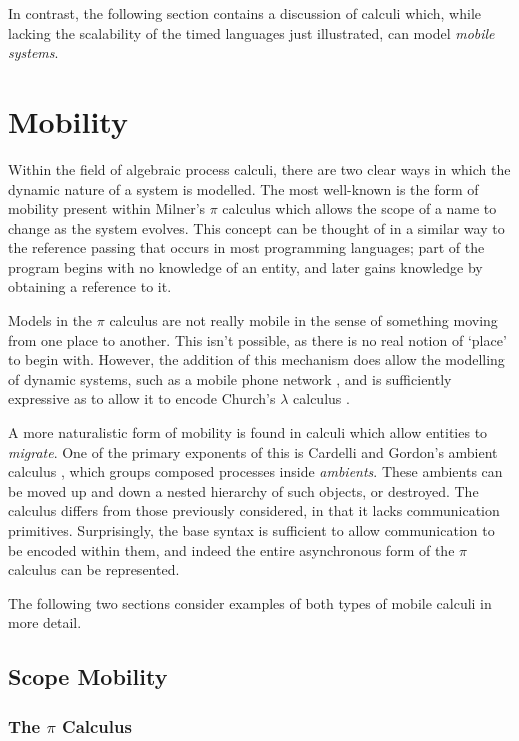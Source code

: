 In contrast, the following section contains a discussion of calculi
which, while lacking the scalability of the timed languages just
illustrated, can model \emph{mobile systems}.

\section{Mobility}
\label{mobility}

Within the field of algebraic process calculi, there are two clear ways
in which the dynamic nature of a system is modelled.  The most
well-known is the form of mobility present within Milner's $\pi$
calculus which allows the scope of a name to change as the system
evolves.  This concept can be thought of in a similar way to the
reference passing that occurs in most programming languages; part of the
program begins with no knowledge of an entity, and later gains knowledge
by obtaining a reference to it.

Models in the $\pi$ calculus are not really mobile in the sense of
something moving from one place to another.  This isn't possible, as
there is no real notion of `place' to begin with.  However, the addition
of this mechanism does allow the modelling of dynamic systems, such as a
mobile phone network \cite{milner:lecture}, and is sufficiently
expressive as to allow it to encode Church's $\lambda$ calculus
\cite{funcproc}.

A more naturalistic form of mobility is found in calculi which allow
entities to \emph{migrate}.  One of the primary exponents of this is
Cardelli and Gordon's ambient calculus \cite{amb}, which groups
composed processes inside \emph{ambients}.  These ambients can be
moved up and down a nested hierarchy of such objects, or destroyed.  The
calculus differs from those previously considered, in that it
lacks communication primitives.  Surprisingly, the base syntax is
sufficient to allow communication to be encoded within them, and
indeed the entire asynchronous form of the $\pi$ calculus can be
represented.

The following two sections consider examples of both types of mobile
calculi in more detail.
 
\subsection{Scope Mobility}
\label{scopemobility}

\subsubsection{The $\pi$ Calculus}

